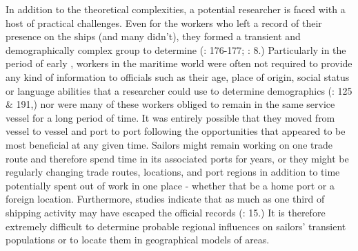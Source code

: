 In addition to the theoretical complexities, a potential researcher is faced with a host of practical challenges. Even for the workers who left a record of their presence on the ships (and many didn’t), they formed a transient and demographically complex group to determine (\citealt{AdkinsAdkins2008}: 176-177; \citealt{Fusaro2015}: 8.) Particularly in the period of early , workers in the maritime world were often not required to provide any kind of information to officials such as their age, place of origin, social status or language abilities that a researcher could use to determine demographics (\citealt{Litter1999}: 125 \& 191,) nor were many of these workers obliged to remain in the same service vessel for a long period of time. It was entirely possible that they moved from vessel to vessel and port to port following the opportunities that appeared to be most beneficial at any given time. Sailors might remain working on one trade route and therefore spend time in its associated ports for years, or they might be regularly changing trade routes, locations, and port regions in addition to time potentially spent out of work in one place - whether that be a home port or a foreign location. Furthermore, studies indicate that as much as one third of shipping activity may have escaped the official records (\citealt{Cook2005}: 15.) It is therefore extremely difficult to determine probable regional influences on sailors’ transient populations or to locate them in geographical models of  areas.



